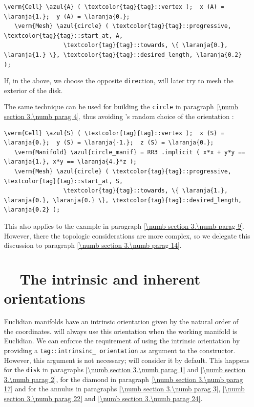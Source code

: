 \begin{Verbatim}[commandchars=\\\{\},formatcom=\small\tt,
   baselinestretch=0.94,framesep=2mm                     ]
   \verm{Cell} \azul{A} ( \textcolor{tag}{tag}::vertex );  x (A) = \laranja{1.};  y (A) = \laranja{0.};
   \verm{Mesh} \azul{circle} ( \textcolor{tag}{tag}::progressive, \textcolor{tag}{tag}::start_at, A,
                 \textcolor{tag}{tag}::towards, \{ \laranja{0.}, \laranja{1.} \}, \textcolor{tag}{tag}::desired_length, \laranja{0.2} );
\end{Verbatim}

If, in the above, we choose the opposite {\small\tt direc}tion,
{\maniFEM} will later try to mesh the exterior of the disk.

The same technique can be used for building the {\small\tt circle} in paragraph
\ref{\numb section 3.\numb parag 4}, thus avoiding \maniFEM's random choice of the orientation :

\begin{Verbatim}[commandchars=\\\{\},formatcom=\small\tt,
   baselinestretch=0.94,framesep=2mm                     ]
   \verm{Cell} \azul{S} ( \textcolor{tag}{tag}::vertex );  x (S) = \laranja{0.};  y (S) = \laranja{-1.};  z (S) = \laranja{0.};
   \verm{Manifold} \azul{circle_manif} = RR3 .implicit ( x*x + y*y == \laranja{1.}, x*y == \laranja{4.}*z );
   \verm{Mesh} \azul{circle} ( \textcolor{tag}{tag}::progressive, \textcolor{tag}{tag}::start_at, S,
                 \textcolor{tag}{tag}::towards, \{ \laranja{1.}, \laranja{0.}, \laranja{0.} \}, \textcolor{tag}{tag}::desired_length, \laranja{0.2} );
\end{Verbatim}

This also applies to the example in paragraph \ref{\numb section 3.\numb parag 9}.
However, there the topologic considerations are more complex, so we delegate this
discussion to paragraph \ref{\numb section 3.\numb parag 14}.


\section{~~The intrinsic and inherent orientations}\label{\numb section 3.\numb parag 13}

Euclidian manifolds have an intrinsic orientation given by the natural order of the
coordinates.
{\ManiFEM} will always use this orientation when the working manifold is Euclidian.
We can enforce the requirement of using the intrinsic orientation by providing a
{\small\tt \textcolor{tag}{tag}::intrinsinc\_\,orien\-tation} as argument to the {\small\tt {}} constructor.
However, this argument is not necessary; {\maniFEM} will consider it by default.
This happens for the {\small\tt disk} in paragraphs \ref{\numb section 3.\numb parag 1} and
\ref{\numb section 3.\numb parag 2}, for the diamond in
paragraph \ref{\numb section 3.\numb parag 17} and for the annulus in paragraphs
\ref{\numb section 3.\numb parag 3}, \ref{\numb section 3.\numb parag 22}
and \ref{\numb section 3.\numb parag 24}.

